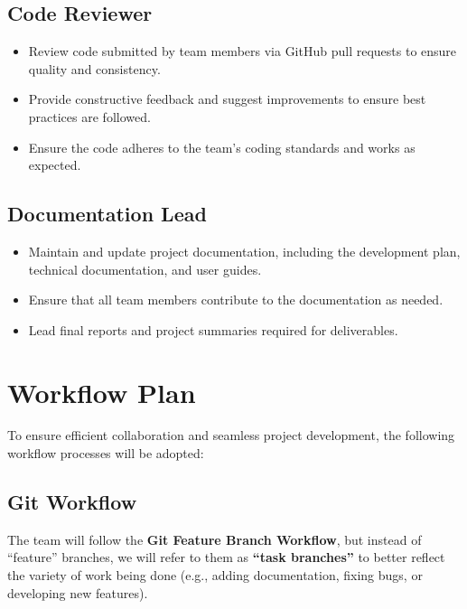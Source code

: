 \documentclass{article}
\begin{document}
\subsection{Code Reviewer}
  \begin{itemize}
    \item Review code submitted by team members via GitHub pull requests to ensure quality and consistency.
    \item Provide constructive feedback and suggest improvements to ensure best practices are followed.
    \item Ensure the code adheres to the team's coding standards and works as expected.
  \end{itemize}

\subsection{Documentation Lead}
  \begin{itemize}
    \item Maintain and update project documentation, including the development plan, technical documentation, and user guides.
    \item Ensure that all team members contribute to the documentation as needed.
    \item Lead final reports and project summaries required for deliverables.
  \end{itemize}

\section{Workflow Plan}
To ensure efficient collaboration and seamless project development, the following workflow processes will be adopted:

\subsection{Git Workflow}
The team will follow the \textbf{Git Feature Branch Workflow}, but instead of ``feature'' branches, we will refer to them as \textbf{``task branches''} to better reflect the variety of work being done (e.g., adding documentation, fixing bugs, or developing new features).
\end{document}

